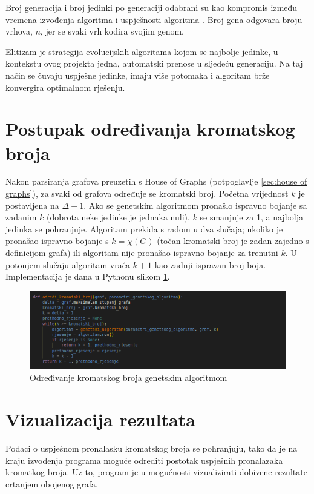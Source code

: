 \documentclass[times, utf8, zavrsni, numeric]{fer}
\begin{document}
Broj generacija i broj jedinki po generaciji odabrani su kao kompromis između vremena izvođenja algoritma i uspješnosti algoritma \cite{hindi2012genetic}. Broj gena odgovara broju vrhova, $n$, jer se svaki vrh kodira svojim genom. 

Elitizam je strategija evolucijskih algoritama kojom se najbolje jedinke, u kontekstu ovog projekta jedna, automatski prenose u sljedeću generaciju. Na taj način se čuvaju uspješne jedinke, imaju više potomaka i algoritam brže konvergira optimalnom rješenju. 

\section{Postupak određivanja kromatskog broja}
Nakon parsiranja grafova preuzetih s House of Graphs (potpoglavlje \ref{sec:house of graphs}), za svaki od grafova određuje se kromatski broj. Početna vrijednost $k$ je postavljena na $\Delta + 1$. Ako se genetskim algoritmom pronašlo ispravno bojanje sa zadanim $k$ (dobrota neke jedinke je jednaka nuli), $k$ se smanjuje za 1, a najbolja jedinka se pohranjuje. Algoritam prekida s radom u dva slučaja; ukoliko je pronašao ispravno bojanje s $k=\chi(G)$ (točan kromatski broj je zadan zajedno s definicijom grafa) ili algoritam nije pronašao ispravno bojanje za trenutni $k$. U potonjem slučaju algoritam vraća $k+1$ kao zadnji ispravan broj boja. Implementacija je dana u Pythonu slikom \ref{fig:odredivanje kromatskog broja genetskim algoritmom}.

\begin{figure}[htb]
\centering
\includegraphics[width=14cm]{images/genetski_algoritam_i_odredivanje_broja.png}
\caption{Određivanje kromatskog broja genetskim algoritmom}
\label{fig:odredivanje kromatskog broja genetskim algoritmom}
\end{figure}

\section{Vizualizacija rezultata}
Podaci o uspješnom pronalasku kromatskog broja se pohranjuju, tako da je na kraju izvođenja programa moguće odrediti postotak uspješnih pronalazaka kromatkog broja. Uz to, program je u mogućnosti vizualizirati dobivene rezultate crtanjem obojenog grafa.
\end{document}
